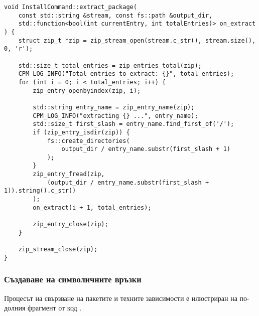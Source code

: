 \begin{lstlisting}[style=cpp,
				   caption=Функция за декомпресиране на пакет,
				   label={lst:install-extract}]
void InstallCommand::extract_package(
    const std::string &stream, const fs::path &output_dir,
    std::function<bool(int currentEntry, int totalEntries)> on_extract
) {
    struct zip_t *zip = zip_stream_open(stream.c_str(), stream.size(), 0, 'r');

    std::size_t total_entries = zip_entries_total(zip);
    CPM_LOG_INFO("Total entries to extract: {}", total_entries);
    for (int i = 0; i < total_entries; i++) {
        zip_entry_openbyindex(zip, i);

        std::string entry_name = zip_entry_name(zip);
        CPM_LOG_INFO("extracting {} ...", entry_name);
        std::size_t first_slash = entry_name.find_first_of('/');
        if (zip_entry_isdir(zip)) {
            fs::create_directories(
				output_dir / entry_name.substr(first_slash + 1)
			);
        }
        zip_entry_fread(zip,
			(output_dir / entry_name.substr(first_slash + 1)).string().c_str()
		);
        on_extract(i + 1, total_entries);

        zip_entry_close(zip);
    }

    zip_stream_close(zip);
}
\end{lstlisting}


\subsubsection{Създаване на символичните връзки}

Процесът на свързване на пакетите и техните зависимости е илюстриран на
по-долния фрагмент от код . \\ \\

